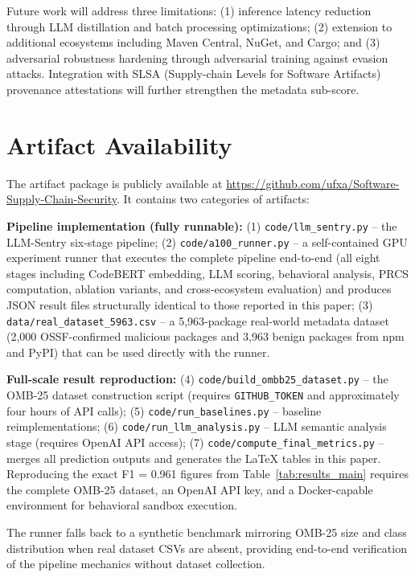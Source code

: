 \documentclass[conference]{IEEEtran}
\begin{document}
Future work will address three limitations: (1) inference latency reduction through LLM distillation and batch processing optimizations; (2) extension to additional ecosystems including Maven Central, NuGet, and Cargo; and (3) adversarial robustness hardening through adversarial training against evasion attacks. Integration with SLSA (Supply-chain Levels for Software Artifacts) provenance attestations will further strengthen the metadata sub-score.

\section*{Artifact Availability}
\label{sec:artifact}

The artifact package is publicly available at \url{https://github.com/ufxa/Software-Supply-Chain-Security}. It contains two categories of artifacts:

\textbf{Pipeline implementation (fully runnable):} (1) \texttt{code/llm\_sentry.py} -- the LLM-Sentry six-stage pipeline; (2) \texttt{code/a100\_runner.py} -- a self-contained GPU experiment runner that executes the complete pipeline end-to-end (all eight stages including CodeBERT embedding, LLM scoring, behavioral analysis, PRCS computation, ablation variants, and cross-ecosystem evaluation) and produces JSON result files structurally identical to those reported in this paper; (3) \texttt{data/real\_dataset\_5963.csv} -- a 5,963-package real-world metadata dataset (2,000 OSSF-confirmed malicious packages and 3,963 benign packages from npm and PyPI) that can be used directly with the runner.

\textbf{Full-scale result reproduction:} (4) \texttt{code/build\_ombb25\_dataset.py} -- the OMB-25 dataset construction script (requires \texttt{GITHUB\_TOKEN} and approximately four hours of API calls); (5) \texttt{code/run\_baselines.py} -- baseline reimplementations; (6) \texttt{code/run\_llm\_analysis.py} -- LLM semantic analysis stage (requires OpenAI API access); (7) \texttt{code/compute\_final\_metrics.py} -- merges all prediction outputs and generates the \LaTeX{} tables in this paper. Reproducing the exact F1 = 0.961 figures from Table~\ref{tab:results_main} requires the complete OMB-25 dataset, an OpenAI API key, and a Docker-capable environment for behavioral sandbox execution.

The runner falls back to a synthetic benchmark mirroring OMB-25 size and class distribution when real dataset CSVs are absent, providing end-to-end verification of the pipeline mechanics without dataset collection.
\end{document}
